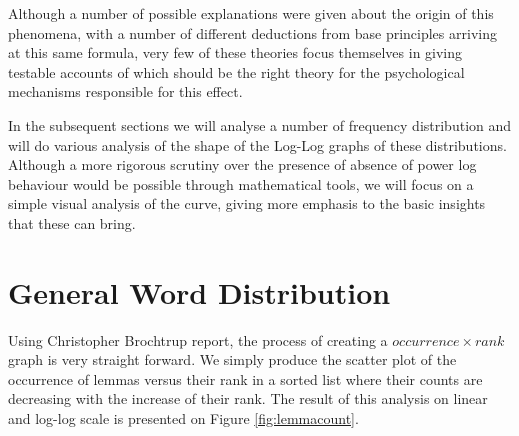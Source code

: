 Although a number of possible explanations were given about the origin of this phenomena, with a number of different deductions from base principles arriving at this same formula, very few of these theories focus themselves in giving testable accounts of which should be the right theory for the psychological mechanisms responsible for this effect\cite{piantadosi2014zipf}. 

In the subsequent sections we will analyse a number of frequency distribution and will do various analysis of the shape of the Log-Log graphs of these distributions. Although a more rigorous scrutiny over the presence of absence of power log behaviour would be possible through mathematical tools\cite{newman2005power}, we will focus on a simple visual analysis of the curve, giving more emphasis to the basic insights that these can bring.

\section{General Word Distribution}\label{freq:word}

Using Christopher Brochtrup report, the process of creating a \(occurrence \times rank\) graph is very straight forward. We simply produce the scatter plot of the occurrence of lemmas versus their rank in a sorted list where their counts are decreasing with the increase of their rank. The result of this analysis on linear and log-log scale is presented on Figure \ref{fig:lemmacount}.

